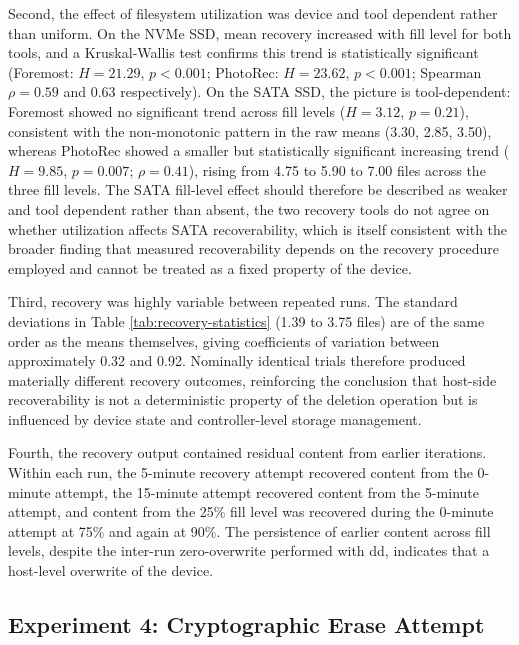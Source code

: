 Second, the effect of filesystem utilization was device and tool dependent rather than uniform. On the NVMe SSD, mean recovery increased with fill level for both tools, 
and a Kruskal-Wallis test confirms this trend is statistically significant (Foremost: $H = 21.29$, $p < 0.001$; PhotoRec: $H = 23.62$, $p < 0.001$; Spearman $\rho = 0.59$ 
and $0.63$ respectively). On the SATA SSD, the picture is tool-dependent: Foremost showed no significant trend across fill levels ($H = 3.12$, $p = 0.21$), consistent 
with the non-monotonic pattern in the raw means (3.30, 2.85, 3.50), whereas PhotoRec showed a smaller but statistically significant increasing trend ($H = 9.85$, 
$p = 0.007$; $\rho = 0.41$), rising from 4.75 to 5.90 to 7.00 files across the three fill levels. The SATA fill-level effect should therefore be described as weaker and 
tool dependent rather than absent, the two recovery tools do not agree on whether utilization affects SATA recoverability, which is itself consistent with the broader 
finding that measured recoverability depends on the recovery procedure employed and cannot be treated as a fixed property of the device.

Third, recovery was highly variable between repeated runs. The standard deviations in Table \ref{tab:recovery-statistics} (1.39 to 3.75 files) are of the same order as 
the means themselves, giving coefficients of variation between approximately 0.32 and 0.92. Nominally identical trials therefore produced materially different recovery 
outcomes, reinforcing the conclusion that host-side recoverability is not a deterministic property of the deletion operation but is influenced by device state and 
controller-level storage management.

Fourth, the recovery output contained residual content from earlier iterations. Within each run, the 5-minute recovery attempt recovered content from the 0-minute 
attempt, the 15-minute attempt recovered content from the 5-minute attempt, and content from the 25\% fill level was recovered during the 0-minute attempt at 75\% and 
again at 90\%. The persistence of earlier content across fill levels, despite the inter-run zero-overwrite performed with dd, indicates that a host-level overwrite of 
the device.


\subsection{Experiment 4: Cryptographic Erase Attempt}

